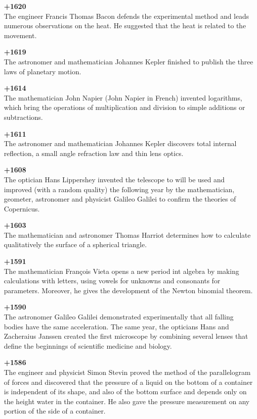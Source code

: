 \textbf{+1620}\\
The engineer Francis Thomas Bacon defends the experimental method and leads numerous observations on the heat. He suggested that the heat is related to the movement.

\textbf{+1619}\\
The astronomer and mathematician Johannes Kepler finished to publish the three laws of planetary motion.

\textbf{+1614}\\
The mathematician John Napier (John Napier in French) invented logarithms, which bring the operations of multiplication and division to simple additions or subtractions.

\textbf{+1611}\\
The astronomer and mathematician Johannes Kepler discovers total internal reflection, a small angle refraction law and thin lens optics.

\textbf{+1608}\\
The optician Hans Lippershey invented the telescope to will be used and improved (with a random quality) the following year by the mathematician, geometer, astronomer and physicist Galileo Galilei to confirm the theories of Copernicus.

\textbf{+1603}\\
The mathematician and astronomer Thomas Harriot determines how to calculate qualitatively the surface of a spherical triangle.

\pagebreak
\textbf{+1591}\\
The mathematician François Vieta opens a new period int algebra by making calculations with letters, using vowels for unknowns and consonants for parameters. Moreover, he gives the development of the Newton binomial theorem.

\textbf{+1590}\\
The astronomer Galileo Galilei demonstrated experimentally that all falling bodies have the same acceleration. The same year, the opticians Hans and Zacheraius Janssen created the first microscope by combining several lenses that define the beginnings of scientific medicine and biology.

\textbf{+1586}\\
The engineer and physicist Simon Stevin proved the method of the parallelogram of forces and discovered that the pressure of a liquid on the bottom of a container is independent of its shape, and also of the bottom surface and depends only on the height water in the container. He also gave the pressure measurement on any portion of the side of a container.

